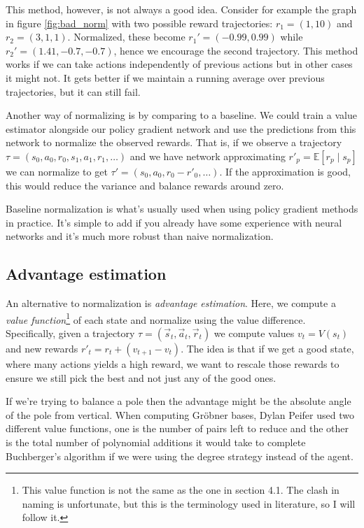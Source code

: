 \documentclass{article}
\theoremstyle{changedot}
\theoremstyle{changedotbreak}
\theoremstyle{nonumberplain}
\newcommand{\m}{\mathbb}
\begin{document}
This method, however, is not always a good idea. Consider for example the graph in figure \ref{fig:bad_norm} with two possible reward trajectories: $r_{1} = (1, 10)$ and $r_{2} = (3, 1, 1)$. Normalized, these become $r_{1}' = (-0.99, 0.99)$ while $r_{2}' = (1.41, -0.7, -0.7)$, hence we encourage the second trajectory. This method works if we can take actions independently of previous actions but in other cases it might not. It gets better if we maintain a running average over previous trajectories, but it can still fail.

Another way of normalizing is by comparing to a baseline. We could train a value estimator alongside our policy gradient network and use the predictions from this network to normalize the observed rewards. That is, if we observe a trajectory $\tau = (s_{0}, a_{0}, r_{0}, s_{1}, a_{1}, r_{1}, \dots)$ and we have network approximating $r'_{p} = \m E[r_{p} \mid s_{p}]$ we can normalize to get $\tau' = (s_{0}, a_{0}, r_{0} - r'_{0}, \dots)$. If the approximation is good, this would reduce the variance and balance rewards around zero.

Baseline normalization is what's usually used when using policy gradient methods in practice. It's simple to add if you already have some experience with neural networks and it's much more robust than naive normalization.


\subsection{Advantage estimation}
An alternative to normalization is \emph{advantage estimation}. Here, we compute a \emph{value function}\footnote{This value function is not the same as the one in section 4.1. The clash in naming is unfortunate, but this is the terminology used in literature, so I will follow it.} of each state and normalize using the value difference. Specifically, given a trajectory $\tau = (\overrightarrow s_{t}, \overrightarrow a_{t}, \overrightarrow r_{t})$ we compute values $v_{t} = V(s_{t})$ and new rewards $r'_{t} = r_{t} + (v_{t+1} - v_{t})$. The idea is that if we get a good state, where many actions yields a high reward, we want to rescale those rewards to ensure we still pick the best and not just any of the good ones.

If we're trying to balance a pole then the advantage might be the absolute angle of the pole from vertical. When computing Gröbner bases, Dylan Peifer used two different value functions, one is the number of pairs left to reduce and the other is the total number of polynomial additions it would take to complete Buchberger's algorithm if we were using the degree strategy instead of the agent.
\end{document}
